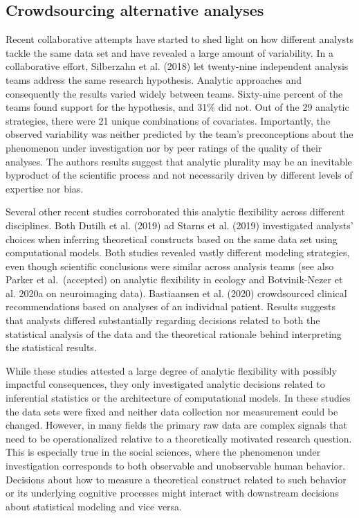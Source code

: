 \documentclass[
  12pt,
]{article}
\begin{document}
\hypertarget{crowdsourcing-alternative-analyses}{%
\subsection{Crowdsourcing alternative analyses}\label{crowdsourcing-alternative-analyses}}

Recent collaborative attempts have started to shed light on how different analysts tackle the same data set and have revealed a large amount of variability.
In a collaborative effort, Silberzahn et al. (2018) let twenty-nine independent analysis teams address the same research hypothesis.
Analytic approaches and consequently the results varied widely between teams.
Sixty-nine percent of the teams found support for the hypothesis, and 31\% did not.
Out of the 29 analytic strategies, there were 21 unique combinations of covariates.
Importantly, the observed variability was neither predicted by the team's preconceptions about the phenomenon under investigation nor by peer ratings of the quality of their analyses.
The authors results suggest that analytic plurality may be an inevitable byproduct of the scientific process and not necessarily driven by different levels of expertise nor bias.

Several other recent studies corroborated this analytic flexibility across different disciplines.
Both Dutilh et al. (2019) ad Starns et al. (2019) investigated analysts' choices when inferring theoretical constructs based on the same data set using computational models.
Both studies revealed vastly different modeling strategies, even though scientific conclusions were similar across analysis teams (see also Parker et al.~(accepted) on analytic flexibility in ecology and Botvinik-Nezer et al. 2020a on neuroimaging data).
Bastiaansen et al. (2020) crowdsourced clinical recommendations based on analyses of an individual patient.
Results suggests that analysts differed substantially regarding decisions related to both the statistical analysis of the data and the theoretical rationale behind interpreting the statistical results.

While these studies attested a large degree of analytic flexibility with possibly impactful consequences, they only investigated analytic decisions related to inferential statistics or the architecture of computational models.
In these studies the data sets were fixed and neither data collection nor measurement could be changed.
However, in many fields the primary raw data are complex signals that need to be operationalized relative to a theoretically motivated research question.
This is especially true in the social sciences, where the phenomenon under investigation corresponds to both observable and unobservable human behavior.
Decisions about how to measure a theoretical construct related to such behavior or its underlying cognitive processes might interact with downstream decisions about statistical modeling and vice versa.
\end{document}
